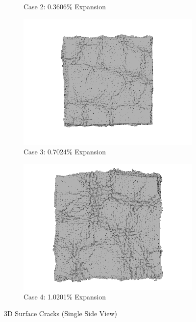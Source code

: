 \begin{figure}[!h]
\begin{subfigure}{.5\textwidth}
    \caption{Case 2: 0.3606\% Expansion}
    \end{subfigure}%
    \begin{subfigure}{.5\textwidth}
      \centering
      \includegraphics[width=.9\linewidth]{Files/exp_3D/ASR/A30P25_3_3ds.png}
    \caption{Case 3: 0.7024\% Expansion}
    \end{subfigure}
    \begin{subfigure}{.5\textwidth}
      \centering
      \includegraphics[width=.8\linewidth]{Files/exp_3D/ASR/A30P25_4_3ds.png}
    \caption{Case 4: 1.0201\% Expansion}
    \end{subfigure}%

  \caption{3D Surface Cracks (Single Side View)}
  \label{fig:ASR_A30P25_3DS}
\end{figure}

